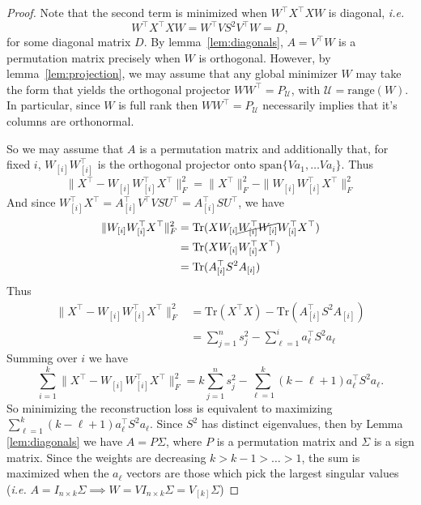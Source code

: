 \documentclass[twoside,11pt]{article}
\begin{document}
\begin{proof}
    Note that the second term is minimized when $W^\top X^\top XW$ is diagonal, \emph{i.e.} \[W^\top X^\top XW = W^\top VS^2V^\top W = D,\] for some diagonal matrix $D$. By lemma~\ref{lem:diagonals}, $A = V^\top W$ is a permutation matrix precisely when $W$ is orthogonal. However, by lemma~\ref{lem:projection}, we may assume that any global minimizer $W$ may take the form that yields the orthogonal projector $W W^\top = P_{\mathcal{U}}$, with $ \mathcal{U} = \mathrm{range}(W)$. In particular, since $W$ is full rank then $W W^\top = P_{\mathcal{U}}$ necessarily implies that it's columns are orthonormal.

    So we may assume that $A$ is a permutation matrix and additionally that, for fixed $i$, $W_{[i]}W_{[i]}^\top$ is the orthogonal projector onto $\text{span}\{V a_1, \dots Va_i\}$. Thus \[\|X^\top-W_{[i]}W_{[i]}^\top X^\top\|_F^2 = \|X^\top\|_F^2 - \|W_{[i]}W_{[i]}^\top X^\top\|_F^2\]
    And since $W_{[i]}^\top X^\top = A_{[i]}^\top V^\top VSU^\top = A_{[i]}^\top SU^\top$, we have
    \begin{align*}
        \|W_{[i]}W_{[i]}^\top X^\top\|_F^2 &= \text{Tr}(XW_{[i]}\cancel{W_{[i]}^\top W_{[i]}}W_{[i]}^\top X^\top) \\&= \text{Tr}(XW_{[i]}W_{[i]}^\top X^\top)\\&= \text{Tr}(A_{[i]}^\top S^2 A_{[i]})
    \end{align*}
    Thus
    \begin{align*}
        \|X^\top-W_{[i]}W_{[i]}^\top X^\top\|_F^2 &= \text{Tr}(X^\top X) - \text{Tr}(A_{[i]}^\top S^2 A_{[i]})\\&=
        \sum_{j=1}^n s_j^2 - \sum_{\ell=1}^i a_{\ell}^\top S^2a_\ell
    \end{align*}
    Summing over $i$ we have
    \[\sum_{i=1}^k \|X^\top-W_{[i]}W_{[i]}^\top X^\top\|_F^2 = k\sum_{j=1}^ns_j^2 - \sum_{\ell=1}^k(k-\ell+1)a_\ell^\top S^2a_\ell.\]
    So minimizing the reconstruction loss is equivalent to maximizing $\sum_{\ell=1}^k(k-\ell+1)a_\ell^\top S^2a_\ell$. Since $S^2$ has distinct eigenvalues, then by Lemma \ref{lem:diagonals} we have $A = P\Sigma$, where $P$ is a permutation matrix and $\Sigma$ is a sign matrix. Since the weights are decreasing $k>k-1>\dots >1$, the sum is maximized when the $a_\ell$ vectors are those which pick the largest singular values (\emph{i.e.} $A = I_{n\times k}\Sigma\implies W = VI_{n\times k}\Sigma = V_{[k]}\Sigma$)
\end{proof}
\end{document}
